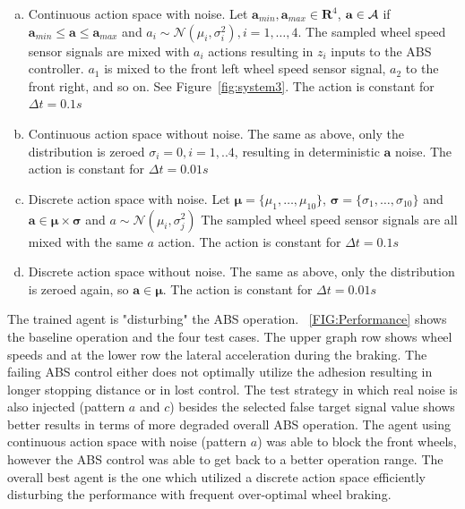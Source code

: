 \documentclass[a4paper, fleqn]{cas-dc}
\begin{document}
	\begin{enumerate}[a)]
		\item Continuous action space with noise.
		Let $\textbf{a}_{min}, \textbf{a}_{max} \in \textbf{R}^4$, $\textbf{a} \in \mathcal{A}$ if $\textbf{a}_{min} \leq \textbf{a} \leq \textbf{a}_{max}$ and $a_i \sim \mathcal{N}(\mu_i, \sigma_i^2), i=1,\ldots,4$. The sampled wheel speed sensor signals are mixed with $a_i$ actions resulting in $z_i$ inputs to the ABS controller. $a_1$ is mixed to the front left wheel speed sensor signal, $a_2$ to the front right, and so on. See Figure~\ref{fig:system3}. The action is constant for $\Delta t = 0.1 s$
		\item Continuous action space without noise.
		The same as above, only the distribution is zeroed $\sigma_i=0, i=1,..4$, resulting in deterministic $\textbf{a}$ noise. The action is constant for $\Delta t = 0.01 s$
		\item Discrete action space with noise.
		Let $\boldsymbol{\mu} = \{\mu_1,\ldots,\mu_{10} \}$, $\boldsymbol{\sigma} = \{\sigma_1,\ldots,\sigma_{10}\}$ and $\textbf{a} \in \boldsymbol{\mu} \times \boldsymbol{\sigma}$ and $a \sim \mathcal{N}(\mu_i, \sigma_j^2)$ The sampled wheel speed sensor signals are all mixed with the same $a$ action. The action is constant for $\Delta t = 0.1 s$
		\item Discrete action space without noise.
		The same as above, only the distribution is zeroed again, so $\textbf{a} \in \boldsymbol{\mu}$. The action is constant for $\Delta t = 0.01 s$
	\end{enumerate}                        
	
		
	The trained agent is "disturbing" the ABS operation. ~\autoref{FIG:Performance} shows the baseline operation and the four test cases. The upper graph row shows wheel speeds and at the lower row the lateral acceleration during the braking. The failing ABS control either does not optimally utilize the adhesion resulting in longer stopping distance or in lost control. The test strategy in which real noise is also injected (pattern $a$ and $c$) besides the selected false target signal value shows better results in terms of more degraded overall ABS operation. The agent using continuous action space with noise (pattern $a$) was able to block the front wheels, however the ABS control was able to get back to a better operation range. The overall best agent is the one which utilized a discrete action space efficiently disturbing the performance with frequent over-optimal wheel braking.
		
\end{document}
